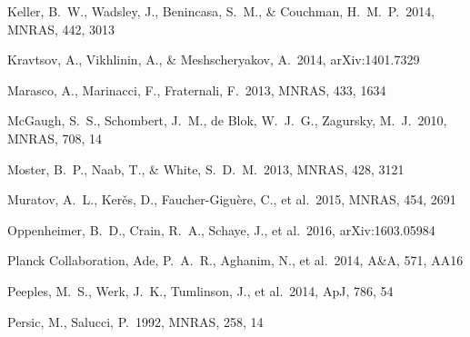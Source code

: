 \documentclass[useAMS,usenatbib]{mn2e}
\def \apj {ApJ}
\def \mnras {MNRAS}
\def \aap {A\&A}
\begin{document}
\begin{thebibliography}{}



 Keller, B.~W., Wadsley, 
  J., Benincasa, S.~M., \& Couchman, H.~M.~P.\ 2014, \mnras, 442, 3013

 Kravtsov, A., 
Vikhlinin, A., \& Meshscheryakov, A.\ 2014, arXiv:1401.7329 

  



Marasco, A., Marinacci, F., Fraternali, F.\ 2013, \mnras, 433, 1634

 McGaugh, S.~S., 
Schombert, J.~M., de Blok, W.~J.~G., Zagursky, M.~J.\ 2010, \mnras,
708, 14

 Moster, B.~P., Naab, T., 
\& White, S.~D.~M.\ 2013, \mnras, 428, 3121 

 Muratov, A.~L., Ker{\v e}s, D., Faucher-Gigu{\`e}re, C., et al.\ 2015, \mnras, 454, 2691




%
 Oppenheimer, B.~D., Crain, R.~A., Schaye, J., et al.\ 2016, arXiv:1603.05984


  Planck Collaboration, Ade, P.~A.~R., Aghanim, N., et al.\ 2014,
  \aap, 571, AA16 
 
 Peeples, M.~S., Werk, J.~K., Tumlinson, J., et al.\ 2014, \apj, 786, 54

 Persic, M., Salucci, P.\ 1992, \mnras, 258, 14


\end{thebibliography}
\end{document}
